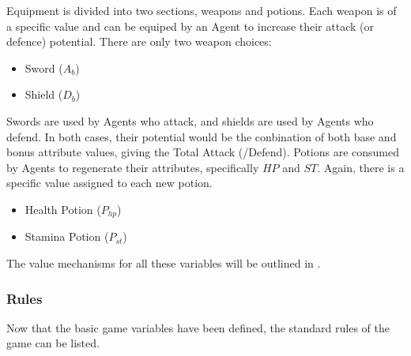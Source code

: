 Equipment is divided into two sections, weapons and potions. Each weapon is of a specific value and can be equiped by an Agent to increase their attack (or defence) potential. There are only two weapon choices:

\begin{itemize}
    \item Sword ($A_b$)
    \item Shield ($D_b$)
\end{itemize}

Swords are used by Agents who attack, and shields are used by Agents who defend. In both cases, their potential would be the conbination of both base and bonus attribute values, giving the Total Attack (/Defend). Potions are consumed by Agents to regenerate their attributes, specifically $HP$ and $ST$. Again, there is a specific value assigned to each new potion. 

\begin{itemize}
    \item Health Potion ($P_{hp}$)
    \item Stamina Potion ($P_{st}$)
\end{itemize}

The value mechanisms for all these variables will be outlined in . 

\subsubsection{Rules}
Now that the basic game variables have been defined, the standard rules of the game can be listed. 

